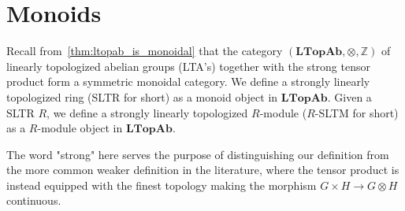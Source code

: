 \section{Monoids}

Recall from~\cref{thm:ltopab_is_monoidal} that the category $(\textbf{LTopAb}, \otimes, \mathbb{Z})$ of linearly topologized abelian groups (LTA's) together with the strong tensor product form a symmetric monoidal category. We define a strongly linearly topologized ring (SLTR for short) as a monoid object in $\textbf{LTopAb}$. Given a SLTR $R$, we define a strongly linearly topologized $R$-module ($R$-SLTM for short) as a $R$-module object in $\textbf{LTopAb}$.

\begin{remark} The word "strong" here serves the purpose of distinguishing our definition from the more common weaker definition in the literature, where the tensor product is instead equipped with the finest topology making the morphism $G \times H \rightarrow G \otimes H$ continuous.
\end{remark}
